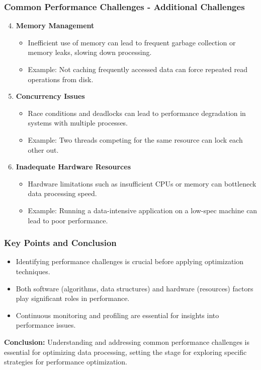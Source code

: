 \documentclass[aspectratio=169]{beamer}
\begin{document}
\begin{frame}[fragile]
    \frametitle{Common Performance Challenges - Additional Challenges}
    \begin{enumerate}
        \setcounter{enumi}{3} %
        \item \textbf{Memory Management}
        \begin{itemize}
            \item Inefficient use of memory can lead to frequent garbage collection or memory leaks, slowing down processing.
            \item Example: Not caching frequently accessed data can force repeated read operations from disk.
        \end{itemize}
        
        \item \textbf{Concurrency Issues}
        \begin{itemize}
            \item Race conditions and deadlocks can lead to performance degradation in systems with multiple processes.
            \item Example: Two threads competing for the same resource can lock each other out.
        \end{itemize}

        \item \textbf{Inadequate Hardware Resources}
        \begin{itemize}
            \item Hardware limitations such as insufficient CPUs or memory can bottleneck data processing speed.
            \item Example: Running a data-intensive application on a low-spec machine can lead to poor performance.
        \end{itemize}
    \end{enumerate}
\end{frame}

\begin{frame}[fragile]
    \frametitle{Key Points and Conclusion}
    \begin{itemize}
        \item Identifying performance challenges is crucial before applying optimization techniques.
        \item Both software (algorithms, data structures) and hardware (resources) factors play significant roles in performance.
        \item Continuous monitoring and profiling are essential for insights into performance issues.
    \end{itemize}
    
    \textbf{Conclusion:} Understanding and addressing common performance challenges is essential for optimizing data processing, setting the stage for exploring specific strategies for performance optimization.
\end{frame}
\end{document}
